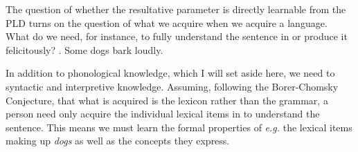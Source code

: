 \documentclass[Milway Thesis]{subfiles}
\begin{document}
The question of whether the resultative parameter is directly learnable from the PLD turns on the question of what we acquire when we acquire a language.
What do we need, for instance, to fully understand the sentence in \Next or produce it felicitously?
\ex. Some dogs bark loudly.

In addition to phonological knowledge, which I will set aside here, we need to syntactic and interpretive knowledge.
Assuming, following the Borer-Chomsky Conjecture, that what is acquired is the lexicon rather than the grammar, a person need only acquire the individual lexical items in \Last to understand the sentence.
This means we must learn the formal properties of \textit{e.g.} the lexical items making up \textit{dogs} as well as the concepts they express.
\end{document}
